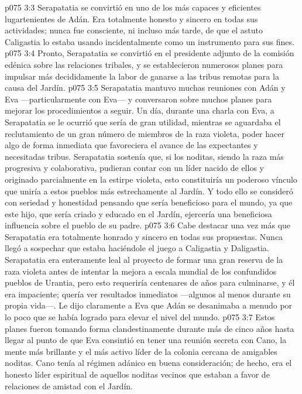 \vs p075 3:3 \pc Serapatatia se convirtió en uno de los más capaces y eficientes lugartenientes de Adán. Era totalmente honesto y sincero en todas sus actividades; nunca fue consciente, ni incluso más tarde, de que el astuto Caligastia lo estaba usando incidentalmente como un instrumento para sus fines.
\vs p075 3:4 \pc Pronto, Serapatatia se convirtió en el presidente adjunto de la comisión edénica sobre las relaciones tribales, y se establecieron numerosos planes para impulsar más decididamente la labor de ganarse a las tribus remotas para la causa del Jardín.
\vs p075 3:5 Serapatatia mantuvo muchas reuniones con Adán y Eva ---particularmente con Eva--- y conversaron sobre muchos planes para mejorar los procedimientos a seguir. Un día, durante una charla con Eva, a Serapatatia se le ocurrió que sería de gran utilidad, mientras se aguardaba el reclutamiento de un gran número de miembros de la raza violeta, poder hacer algo de forma inmediata que favoreciera el avance de las expectantes y necesitadas tribus. Serapatatia sostenía que, si los noditas, siendo la raza más progresiva y colaborativa, pudieran contar con un líder nacido de ellos y originado parcialmente en la estirpe violeta, esto constituiría un poderoso vínculo que uniría a estos pueblos más estrechamente al Jardín. Y todo ello se consideró con seriedad y honestidad pensando que sería beneficioso para el mundo, ya que este hijo, que sería criado y educado en el Jardín, ejercería una beneficiosa influencia sobre el pueblo de su padre.
\vs p075 3:6 Cabe destacar una vez más que Serapatatia era totalmente honrado y sincero en todas sus propuestas. Nunca llegó a sospechar que estaba haciéndole el juego a Caligastia y Daligastia. Serapatatia era enteramente leal al proyecto de formar una gran reserva de la raza violeta antes de intentar la mejora a escala mundial de los confundidos pueblos de Urantia, pero esto requeriría centenares de años para culminarse, y él era impaciente; quería ver resultados inmediatos ---algunos al menos durante su propia vida---. Le dijo claramente a Eva que Adán se desanimaba a menudo por lo poco que se había logrado para elevar el nivel del mundo.
\vs p075 3:7 \pc Estos planes fueron tomando forma clandestinamente durante más de cinco años hasta llegar al punto de que Eva consintió en tener una reunión secreta con Cano, la mente más brillante y el más activo líder de la colonia cercana de amigables noditas. Cano tenía al régimen adánico en buena consideración; de hecho, era el honesto líder espiritual de aquellos noditas vecinos que estaban a favor de relaciones de amistad con el Jardín.
